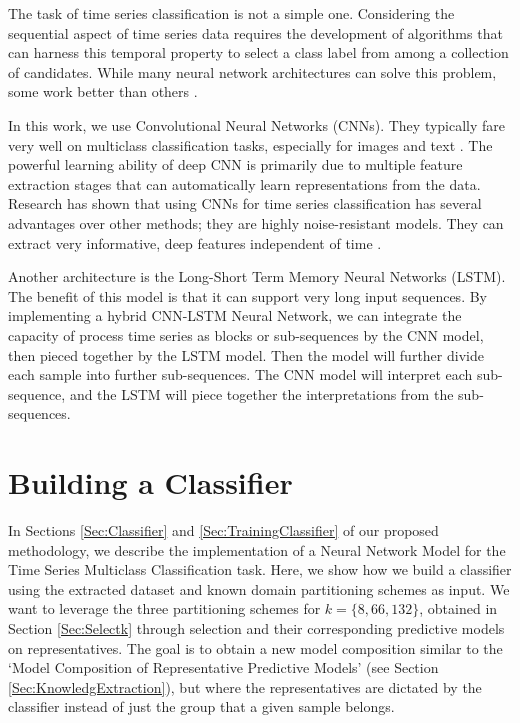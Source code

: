The task of time series classification is not a simple one. Considering the sequential aspect of time series data requires the development of algorithms that can harness this temporal property to select a class label from among a collection of candidates. While many neural network architectures can solve this problem, some work better than others \cite{Bagnall2017a}.

In this work, we use Convolutional Neural Networks (CNNs). They typically fare very well on multiclass classification tasks, especially for images and text \cite{Goodfellow2016}. The powerful learning ability of deep CNN is primarily due to multiple feature extraction stages that can automatically learn representations from the data. Research has shown that using CNNs for time series classification has several advantages over other methods; they are highly noise-resistant models. They can extract very informative, deep features independent of time \cite{Wang2016, Bagnall2017a, Zhao2017}.

Another architecture is the Long-Short Term Memory Neural Networks (LSTM). The benefit of this model is that it can support very long input sequences. By implementing a hybrid CNN-LSTM Neural Network, we can integrate the capacity of process time series as blocks or sub-sequences by the CNN model, then pieced together by the LSTM model. Then the model will further divide each sample into further sub-sequences. The CNN model will interpret each sub-sequence, and the LSTM will piece together the interpretations from the sub-sequences. 

\section{Building a Classifier}
\label{Sec:ExperimentsTrainingClassifier}

In Sections \ref{Sec:Classifier} and \ref{Sec:TrainingClassifier} of our proposed methodology, we describe the implementation of a Neural Network Model for the Time Series Multiclass Classification task. Here, we show how we build a classifier using the extracted dataset and known domain partitioning schemes as input. We want to leverage the three partitioning schemes for $k = \{8, 66, 132\}$, obtained in Section \ref{Sec:Selectk} through selection and their corresponding predictive models on representatives. The goal is to obtain a new model composition similar to the `Model Composition of Representative Predictive Models' (see Section \ref{Sec:KnowledgExtraction}), but where the representatives are dictated by the classifier instead of just the group that a given sample belongs. 

